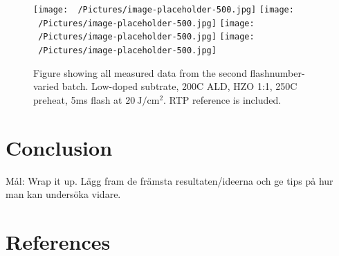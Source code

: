 \documentclass[11pt]{article}
\begin{document}
    \begin{figure}[ht!]
        \centering
        \texttt{[image: ~/Pictures/image-placeholder-500.jpg]}
        \texttt{[image: ~/Pictures/image-placeholder-500.jpg]}
        \texttt{[image: ~/Pictures/image-placeholder-500.jpg]}
        \texttt{[image: ~/Pictures/image-placeholder-500.jpg]}
        \caption{Figure showing all measured data from the second flashnumber-varied batch. Low-doped subtrate, 200C ALD, HZO 1:1, 250C preheat, 5ms flash at $\SI{20}{\joule/\centi\meter^2}$. RTP reference is included.}\label{fig:res_FlashNumC}
    \end{figure}

    

    \section{Conclusion}

    Mål: Wrap it up. Lägg fram de främsta resultaten/ideerna och ge tips på hur man kan undersöka vidare.

    \section{References}
        
        
\end{document}

